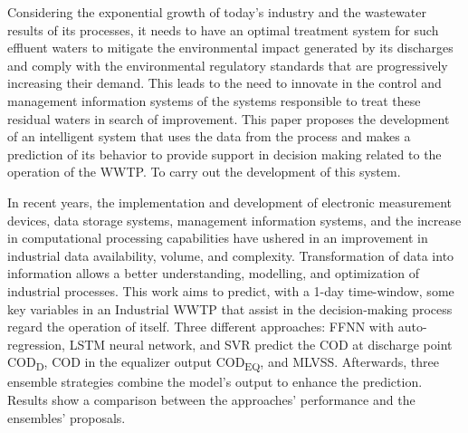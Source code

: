Considering the exponential growth of today’s industry and the wastewater results of its processes, it needs to have an optimal treatment system for such effluent waters to mitigate the environmental impact generated by its discharges and comply with the environmental regulatory standards that are progressively increasing their demand. This leads to the need to innovate in the control and management information systems of the systems responsible to treat these residual waters in search of improvement. This paper proposes the development of an intelligent system that uses the data from the process and makes a prediction of its behavior to provide support in decision making related to the operation of the \ac{WWTP}. To carry out the development of this system.
 
 In recent years, the implementation and development of electronic measurement devices, data storage systems, management information systems, and the increase in computational processing capabilities have ushered in an improvement in industrial data availability, volume, and complexity. Transformation of data into information allows a better understanding, modelling, and optimization of industrial processes. This work aims to predict, with a 1-day time-window, some key variables in an Industrial \ac{WWTP} that assist in the decision-making process regard the operation of itself. Three different approaches: \ac{FFNN} with auto-regression, \ac{LSTM} neural network, and \ac{SVR} predict the \ac{COD} at discharge point \ac{COD}\textsubscript{D}, COD in the equalizer output \ac{COD}\textsubscript{EQ}, and \ac{MLVSS}. Afterwards, three ensemble strategies combine the model’s output to enhance the prediction. Results show a comparison between the approaches’ performance and the ensembles’ proposals.


